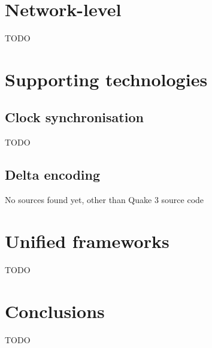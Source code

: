 \documentclass[conference]{IEEEtran}
\begin{document}
	\section{Network-level}

	TODO \cite{yu2008latency} \cite{yu2012latency}

	\section{Supporting technologies}

	\subsection{Clock synchronisation}

	TODO \cite{cristian1989probabilistic}

	\subsection{Delta encoding}

	No sources found yet, other than Quake 3 source code

	\section{Unified frameworks}

	TODO \cite{savery2013timelines} \cite{touch1992mirage} \cite{diot1999distributed}

	\section{Conclusions}

	TODO

	\printbibliography
\end{document}
